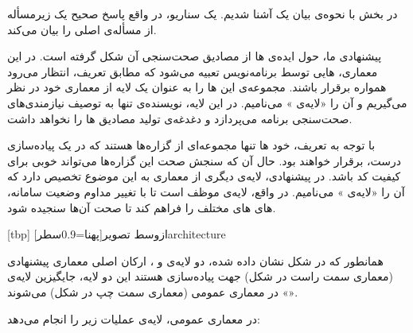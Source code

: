 در بخش  با نحوه‌ی بیان یک  آشنا شدیم. یک سناریو، در واقع پاسخ صحیح یک زیرمسأله از مسأله‌ی اصلی را بیان می‌کند.

 پیشنهادی ما، حول ایده‌ی  ‌ها از مصادیق صحت‌سنجی آن شکل گرفته است. در این معماری، ‌هایی توسط برنامه‌نویس تعبیه می‌شود که مطابق تعریف، انتظار می‌رود همواره برقرار باشند. مجموعه‌ی این ‌ها را به عنوان یک لایه از معماری   خود در نظر می‌گیریم و آن را «لایه‌ی » می‌نامیم. در این لایه، نویسنده‌ی  تنها به توصیف نیازمندی‌های صحت‌سنجی برنامه می‌پردازد و دغدغه‌ی تولید مصادیق ‌ها را نخواهد داشت.

با توجه به تعریف، خود ‌ها تنها مجموعه‌ای از گزاره‌ها هستند که در یک پیاده‌سازی درست، برقرار خواهند بود. حال آن که سنجش صحت این گزاره‌ها می‌تواند  خوبی برای کیفیت کد باشد. در  پیشنهادی، لایه‌ی دیگری از معماری  به این موضوع تخصیص دارد که آن را «لایه‌ی » می‌نامیم. در واقع، لایه‌ی  موظف است تا با تغییر مداوم وضعیت سامانه، ‌های ‌های مختلف را فراهم کند تا صحت آن‌ها سنجیده شود.

[tbp]
‌ازوسط
‌تصویر[پهنا=0.9‌سطر]{architecture}

همانطور که در شکل  نشان داده شده، دو لایه‌ی
 و ، ارکان اصلی معماری پیشنهادی (معماری سمت
راست در شکل) جهت پیاده‌سازی   هستند این دو
لایه، جایگیزین لایه‌ی «» در معماری عمومی (معماری سمت چپ در
شکل) می‌شوند.

در معماری عمومی، لایه‌ی  عملیات زیر را انجام می‌دهد:




